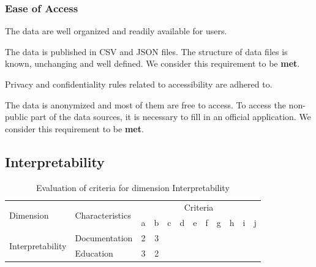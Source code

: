 \subsubsection{Ease of Access}

\begin{QandA}
    \item The data are well organized and readily available for users.
    \begin{answered}
        The data is published in CSV and JSON files.
        The structure of data files is known, unchanging and well defined.
        We consider this requirement to be \textbf{met}.
    \end{answered}

    \item Privacy and confidentiality rules related to accessibility are adhered to.
    \begin{answered}
        The data is anonymized and most of them are free to access.
        To access the non-public part of the data sources, it is necessary to fill in an official application.
        We consider this requirement to be \textbf{met}.
    \end{answered}

\end{QandA}

\subsection{Interpretability}

\begin{table}[htbp]
    \centering

    \begin{tabular}{llrrrrrrrrrr}
        \toprule
        \multirow{2}{*}{Dimension}          & \multirow{2}{*}{Characteristics}  & \multicolumn{10}{c}{Criteria}         \\ \cmidrule(lr){3-12}
                                            &                                   & a & b & c & d & e & f & g & h & i & j \\ \midrule
        \multirow{2}{*}{Interpretability}   & Documentation                     & 2 & 3 &   &   &   &   &   &   &   &   \\
                                            & Education                         & 3 & 2 &   &   &   &   &   &   &   &   \\
        \bottomrule
    \end{tabular}

    \caption{Evaluation of criteria for dimension Interpretability}
    \label{table:interpretability-benchmark}
\end{table}
\FloatBarrier


